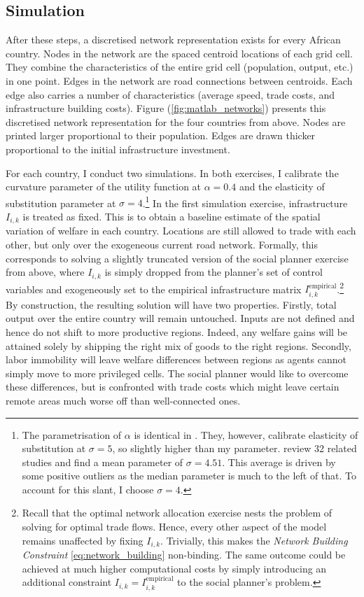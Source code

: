 \documentclass[11pt, oneside]{article}   	%
\let\oldref\ref
\renewcommand{\ref}[1]{(\oldref{#1})}
\begin{document}
\subsection{Simulation}

After these steps, a discretised network representation exists for every African country. Nodes in the network are the spaced centroid locations of each grid cell. They combine the characteristics of the entire grid cell (population, output, etc.) in one point. Edges in the network are road connections between centroids. Each edge also carries a number of characteristics (average speed, trade costs, and infrastructure building costs). Figure \ref{fig:matlab_networks} presents this discretised network representation for the four countries from above. Nodes are printed larger proportional to their population. Edges are drawn thicker proportional to the initial infrastructure investment.

For each country, I conduct two simulations. In both exercises, I calibrate the curvature parameter of the utility function at $\alpha = 0.4$ and the elasticity of substitution parameter at $\sigma=4$.\footnote{The parametrisation of $\alpha$ is identical in \cite{Fajgelbaum_OptimalTransportNetworks_2017}. They, however, calibrate elasticity of substitution at $\sigma=5$, so slightly higher than my parameter. \cite{Head_GravityEquationsWorkhorse_2014} review 32 related studies and find a mean parameter of $\sigma=4.51$. This average is driven by some positive outliers as the median parameter is much to the left of that. To account for this slant, I choose $\sigma=4$.} In the first simulation exercise, infrastructure $I_{i,k}$ is treated as fixed. This is to obtain a baseline estimate of the spatial variation of welfare in each country. Locations are still allowed to trade with each other, but only over the exogeneous current road network. Formally, this corresponds to solving a slightly truncated version of the social planner exercise from above, where $I_{i,k}$ is simply dropped from the planner's set of control variables and exogeneously set to the empirical infrastructure matrix $I_{i,k}^{\textrm{empirical}}$.\footnote{Recall that the optimal network allocation exercise nests the problem of solving for optimal trade flows. Hence, every other aspect of the model remains unaffected by fixing $I_{i,k}$. Trivially, this makes the \emph{Network Building Constraint} \eqref{eq:network_building} non-binding. The same outcome could be achieved at much higher computational costs by simply introducing an additional constraint $I_{i,k} = I_{i,k}^{\textrm{empirical}}$ to the social planner's problem.} By construction, the resulting solution will have two properties. Firstly, total output over the entire country will remain untouched. Inputs are not defined and hence do not shift to more productive regions. Indeed, any welfare gains will be attained solely by shipping the right mix of goods to the right regions. Secondly, labor immobility will leave welfare differences between regions as agents cannot simply move to more privileged cells. The social planner would like to overcome these differences, but is confronted with trade costs which might leave certain remote areas much worse off than well-connected ones.
\end{document}
